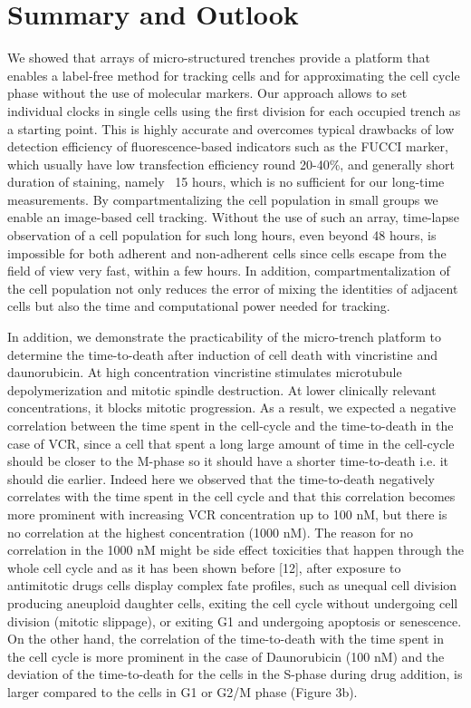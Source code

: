 \documentclass[pdftex,12pt,a4paper]{report}
\begin{document}
\chapter{Summary and Outlook}

We showed that arrays of micro-structured trenches provide a platform that enables a label-free method for tracking cells and for approximating the cell cycle phase without the use of molecular markers. Our approach allows to set individual clocks in single cells using the first division for each occupied trench as a starting point. This is highly accurate and overcomes typical drawbacks of low detection efficiency of fluorescence-based indicators such as the FUCCI marker, which usually have low transfection efficiency round 20-40\%, and generally short duration of staining, namely ~15 hours, which is no sufficient for our long-time measurements. By compartmentalizing the cell population in small groups we enable an image-based cell tracking. Without the use of such an array, time-lapse observation of a cell population for such long hours, even beyond 48 hours, is impossible for both adherent and non-adherent cells since cells escape from the field of view very fast, within a few hours. In addition, compartmentalization of the cell population not only reduces the error of mixing the identities of adjacent cells but also the time and computational power needed for tracking.

In addition, we demonstrate the practicability of the micro-trench platform to determine the time-to-death after induction of cell death with vincristine and daunorubicin. At high concentration vincristine stimulates microtubule depolymerization and mitotic spindle destruction. At lower clinically relevant concentrations, it blocks mitotic progression. As a result, we expected a negative correlation between the time spent in the cell-cycle and the time-to-death in the case of VCR, since a cell that spent a long large amount of time in the cell-cycle should be closer to the M-phase so it should have a shorter time-to-death i.e. it should die earlier. Indeed here we observed that the time-to-death negatively correlates with the time spent in the cell cycle and that this correlation becomes more prominent with increasing VCR concentration up to 100 nM, but there is no correlation at the highest concentration (1000 nM). The reason for no correlation in the 1000 nM might be side effect toxicities that happen through the whole cell cycle and as it has been shown before [12], after exposure to antimitotic drugs cells display complex fate profiles, such as unequal cell division producing aneuploid daughter cells, exiting the cell cycle without undergoing cell division (mitotic slippage), or exiting G1 and undergoing apoptosis or senescence. On the other hand, the correlation of the time-to-death with the time spent in the cell cycle is more prominent in the case of Daunorubicin (100 nM) and the deviation of the time-to-death for the cells in the S-phase during drug addition, is larger compared to the cells in G1 or G2/M phase (Figure 3b).
\end{document}
